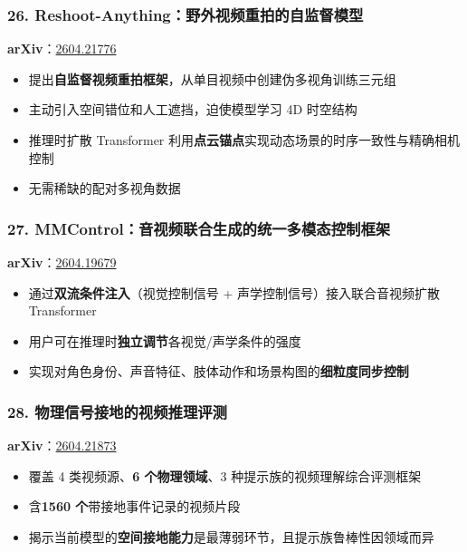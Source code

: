 \subsubsection{26. Reshoot-Anything：野外视频重拍的自监督模型}

\textbf{arXiv}：\href{https://arxiv.org/abs/2604.21776}{2604.21776}

\begin{itemize}[leftmargin=1.5em]
  \item 提出\textbf{自监督视频重拍框架}，从单目视频中创建伪多视角训练三元组
  \item 主动引入空间错位和人工遮挡，迫使模型学习 4D 时空结构
  \item 推理时扩散 Transformer 利用\textbf{点云锚点}实现动态场景的时序一致性与精确相机控制
  \item 无需稀缺的配对多视角数据
\end{itemize}

\subsubsection{27. MMControl：音视频联合生成的统一多模态控制框架}

\textbf{arXiv}：\href{https://arxiv.org/abs/2604.19679}{2604.19679}

\begin{itemize}[leftmargin=1.5em]
  \item 通过\textbf{双流条件注入}（视觉控制信号 + 声学控制信号）接入联合音视频扩散 Transformer
  \item 用户可在推理时\textbf{独立调节}各视觉/声学条件的强度
  \item 实现对角色身份、声音特征、肢体动作和场景构图的\textbf{细粒度同步控制}
\end{itemize}

\subsubsection{28. 物理信号接地的视频推理评测}

\textbf{arXiv}：\href{https://arxiv.org/abs/2604.21873}{2604.21873}

\begin{itemize}[leftmargin=1.5em]
  \item 覆盖 4 类视频源、\textbf{6 个物理领域}、3 种提示族的视频理解综合评测框架
  \item 含\textbf{1560 个}带接地事件记录的视频片段
  \item 揭示当前模型的\textbf{空间接地能力}是最薄弱环节，且提示族鲁棒性因领域而异
\end{itemize}

